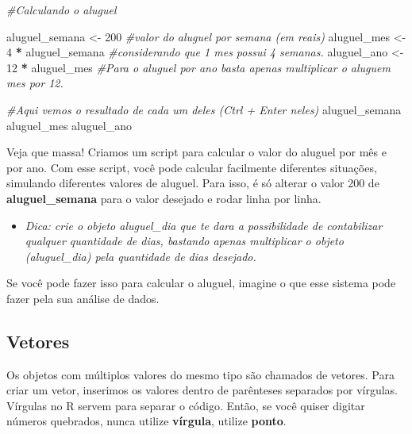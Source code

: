\documentclass[
]{book}
\newenvironment{Shaded}{\begin{snugshade}}{\end{snugshade}}
\newcommand{\CommentTok}[1]{\textcolor[rgb]{0.56,0.35,0.01}{\textit{#1}}}
\newcommand{\DecValTok}[1]{\textcolor[rgb]{0.00,0.00,0.81}{#1}}
\newcommand{\NormalTok}[1]{#1}
\newcommand{\OtherTok}[1]{\textcolor[rgb]{0.56,0.35,0.01}{#1}}
\newcommand{\SpecialCharTok}[1]{\textcolor[rgb]{0.81,0.36,0.00}{\textbf{#1}}}
\providecommand{\tightlist}{%
  \setlength{\itemsep}{0pt}\setlength{\parskip}{0pt}}
\begin{document}
\begin{Shaded}
\begin{Highlighting}[]
\CommentTok{\#Calculando o aluguel}

\NormalTok{aluguel\_semana }\OtherTok{\textless{}{-}} \DecValTok{200}              \CommentTok{\#valor do aluguel por semana (em reais)}
\NormalTok{aluguel\_mes }\OtherTok{\textless{}{-}} \DecValTok{4} \SpecialCharTok{*}\NormalTok{ aluguel\_semana  }\CommentTok{\#considerando que 1 mes possui 4 semanas.}
\NormalTok{aluguel\_ano }\OtherTok{\textless{}{-}} \DecValTok{12} \SpecialCharTok{*}\NormalTok{ aluguel\_mes    }\CommentTok{\#Para o aluguel por ano basta apenas multiplicar o aluguem mes por 12.}

\CommentTok{\#Aqui vemos o resultado de cada um deles (Ctrl + Enter neles)}
\NormalTok{aluguel\_semana}
\NormalTok{aluguel\_mes}
\NormalTok{aluguel\_ano}
\end{Highlighting}
\end{Shaded}

Veja que massa! Criamos um script para calcular o valor do aluguel por mês e por ano. Com esse script, você pode calcular facilmente diferentes situações, simulando diferentes valores de aluguel. Para isso, é só alterar o valor 200 de \textbf{aluguel\_semana} para o valor desejado e rodar linha por linha.

\begin{itemize}
\tightlist
\item
  \emph{Dica: crie o objeto aluguel\_dia que te dara a possibilidade de contabilizar qualquer quantidade de dias, bastando apenas multiplicar o objeto (aluguel\_dia) pela quantidade de dias desejado.}
\end{itemize}

Se você pode fazer isso para calcular o aluguel, imagine o que esse sistema pode fazer pela sua análise de dados.

\hypertarget{vetores}{%
\subsection{Vetores}\label{vetores}}

Os objetos com múltiplos valores do mesmo tipo são chamados de vetores. Para criar um vetor, inserimos os valores dentro de parênteses separados por vírgulas. Vírgulas no R servem para separar o código. Então, se você quiser digitar números quebrados, nunca utilize \textbf{vírgula}, utilize \textbf{ponto}.
\end{document}
